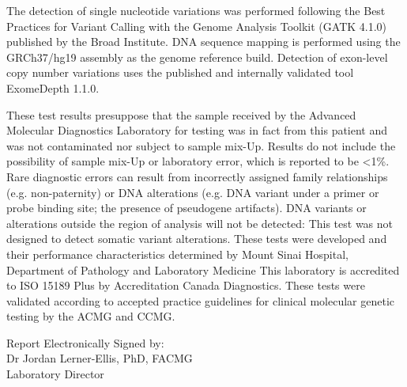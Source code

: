 \documentclass[10pt]{extarticle}
\begin{document}
The detection of single nucleotide variations was performed following the Best Practices for Variant Calling with the Genome Analysis Toolkit (GATK 4.1.0) published by the Broad Institute. DNA sequence mapping is performed using the GRCh37/hg19 assembly as the genome reference build. Detection of exon-level copy number variations uses the published and internally validated tool ExomeDepth 1.1.0.

These test results presuppose that the sample received by the Advanced Molecular Diagnostics Laboratory for testing was in fact from this patient and was not contaminated nor subject to sample mix-Up. Results do not include the possibility of sample mix-Up or laboratory error, which is reported to be <1\%. Rare diagnostic errors can result from incorrectly assigned family relationships (e.g. non-paternity) or DNA alterations (e.g. DNA variant under a primer or probe binding site; the presence of pseudogene artifacts). DNA variants or alterations outside the region of analysis will not be detected: This test was not designed to detect somatic variant alterations. These tests were developed and their performance characteristics determined by Mount Sinai Hospital, Department of Pathology and Laboratory Medicine This laboratory is accredited to ISO 15189 Plus by Accreditation Canada Diagnostics. These tests were validated according to accepted practice guidelines for clinical molecular genetic testing by the ACMG and CCMG.

\vspace{2em}
\hfill \parbox{10cm}{
Report Electronically Signed by: \\
Dr Jordan Lerner-Ellis, PhD, FACMG \\
Laboratory Director
}
\end{document}
